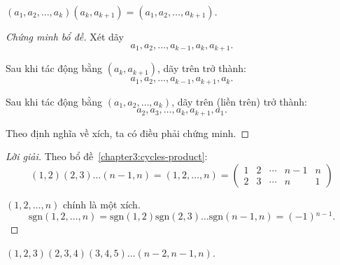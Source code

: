 \documentclass[class=nhvh-linear-algebra,crop=false]{standalone}
\newcommand{\sgn}[1]{\text{sgn}\left({#1}\right)}
\begin{document}
\begin{lemma}\label{chapter3:cycles-product}
    $(a_{1}, a_{2}, \ldots, a_{k})(a_{k},a_{k+1}) = (a_{1},a_{2},\ldots, a_{k+1})$.
\end{lemma}

\begin{proof}[Chứng minh bổ đề]
    \par Xét dãy
    \[
        a_{1}, a_{2}, \ldots, a_{k-1}, a_{k}, a_{k+1}.
    \]
    \par Sau khi tác động bằng $(a_{k},a_{k+1})$, dãy trên trở thành:
    \[
        a_{1}, a_{2}, \ldots, a_{k-1}, a_{k+1}, a_{k}.
    \]
    \par Sau khi tác động bằng $(a_{1}, a_{2}, \ldots, a_{k})$, dãy trên (liền trên) trở thành:
    \[
        a_{2}, a_{3}, \ldots, a_{k}, a_{k+1}, a_{1}.
    \]
    \par Theo định nghĩa về xích, ta có điều phải chứng minh.
\end{proof}

\begin{proof}[Lời giải]
    \par Theo bổ đề~\ref{chapter3:cycles-product}:
    \[
        (1,2)(2,3)\ldots (n-1,n) = (1,2,\ldots,n)
        =
        \begin{pmatrix}
            1 & 2 & \cdots & n-1 & n \\
            2 & 3 & \cdots & n   & 1
        \end{pmatrix}
    \]
    \par $(1,2,\ldots, n)$ chính là một xích.
    \[
        \sgn{1,2,\ldots,n} = \sgn{1,2}\sgn{2,3}\ldots\sgn{n-1,n} = (-1){}^{n-1}.
    \]
\end{proof}

\begin{exercise}
    $(1,2,3)(2,3,4)(3,4,5)\ldots (n-2,n-1,n)$.
\end{exercise}
\end{document}
